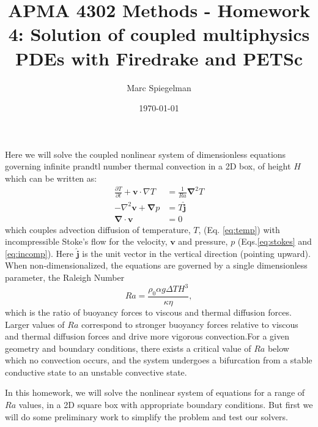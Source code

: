 \documentclass[11pt]{article}
\begin{document}
\lstset{basicstyle=\ttfamily}

\title{APMA 4302 Methods - Homework 4: Solution of coupled multiphysics PDEs with Firedrake and PETSc}
\author{Marc Spiegelman}
\date{\today}
\maketitle

Here we will solve the coupled nonlinear system of dimensionless equations governing infinite prandtl number thermal convection in a 2D box, of height $H$which can be written as:
\begin{align}
  \frac{\partial T}{\partial t} + \mathbf{v} \cdot \nabla T & = \frac{1}{Ra}\mathbf{\nabla}^2 T  \label{eq:temp}\\
  -\nabla^2\mathbf{v} + \mathbf{\nabla} p & = T\hat{\mathbf{j}} \label{eq:stokes}\\
  \mathbf{\nabla} \cdot \mathbf{v} & =  0 \label{eq:incomp}
\end{align}
which couples advection diffusion of temperature, $T$, (Eq. \eqref{eq:temp}) with incompressible Stoke's flow for the velocity, $\mathbf{v}$ and pressure, $p$ (Eqs.\eqref{eq:stokes} and \eqref{eq:incomp}). Here $\hat{\mathbf{j}}$ is the unit vector in the vertical direction (pointing upward). When non-dimensionalized, the equations are  governed by a single dimensionless parameter, the Raleigh Number
\begin{displaymath}
  Ra = \frac{\rho_0\alpha g \Delta T H^3}{\kappa \eta },
\end{displaymath}
which is the ratio of buoyancy forces to viscous and thermal diffusion forces. Larger values of $Ra$ correspond to stronger buoyancy forces relative to viscous and thermal diffusion forces and drive more vigorous convection.For a given geometry and boundary conditions, there exists a critical value of $Ra$ below which no convection occurs, and the system undergoes a bifurcation from a stable conductive state to an unstable convective state.  


In this homework, we will solve the nonlinear system of equations for a range of $Ra$ values,  in a 2D square box with appropriate boundary conditions. But first we will do some preliminary work to simplify the problem and test our solvers. 
\end{document}
